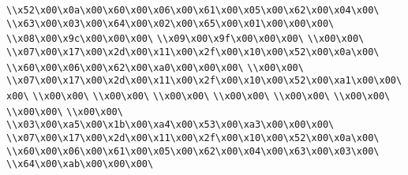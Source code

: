 \verb|\\x52\x00\x0a\x00\x60\x00\x06\x00\x61\x00\x05\x00\x62\x00\x04\x00\|\newline
\verb|\\x63\x00\x03\x00\x64\x00\x02\x00\x65\x00\x01\x00\x00\x00\|\newline
\verb|\\x08\x00\x9c\x00\x00\x00\|\newline
\verb|\\x09\x00\x9f\x00\x00\x00\|\newline
\verb|\\x00\x00\|\newline
\verb|\\x07\x00\x17\x00\x2d\x00\x11\x00\x2f\x00\x10\x00\x52\x00\x0a\x00\|\newline
\verb|\\x60\x00\x06\x00\x62\x00\xa0\x00\x00\x00\|\newline
\verb|\\x00\x00\|\newline
\verb|\\x07\x00\x17\x00\x2d\x00\x11\x00\x2f\x00\x10\x00\x52\x00\xa1\x00\x00\x00\|\newline
\verb|\\x00\x00\|\newline
\verb|\\x00\x00\|\newline
\verb|\\x00\x00\|\newline
\verb|\\x00\x00\|\newline
\verb|\\x00\x00\|\newline
\verb|\\x00\x00\|\newline
\verb|\\x00\x00\|\newline
\verb|\\x00\x00\|\newline
\verb|\\x03\x00\xa5\x00\x1b\x00\xa4\x00\x53\x00\xa3\x00\x00\x00\|\newline
\verb|\\x07\x00\x17\x00\x2d\x00\x11\x00\x2f\x00\x10\x00\x52\x00\x0a\x00\|\newline
\verb|\\x60\x00\x06\x00\x61\x00\x05\x00\x62\x00\x04\x00\x63\x00\x03\x00\|\newline
\verb|\\x64\x00\xab\x00\x00\x00\|\newline
